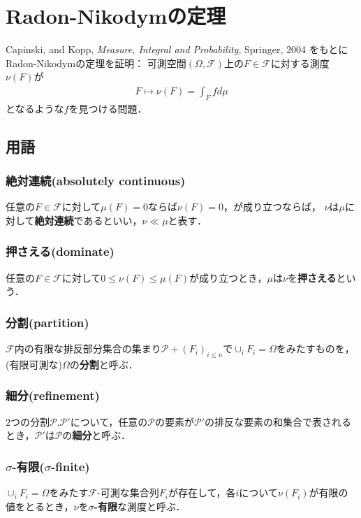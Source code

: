 \documentclass[a4paper,10pt]{jsarticle}
\theoremstyle{definition}
\newcommand{\eq}[1]{\begin{align}#1\end{align}}
\begin{document}
\section{Radon-Nikodymの定理}
Capinski, and Kopp, \textit{Measure, Integral and Probability}, Springer, 2004 をもとにRadon-Nikodymの定理を証明：
可測空間$(\Omega,\mathcal{F})$上の$F\in\mathcal{F}$に対する測度$\nu(F)$が
\eq{F\mapsto\nu(F)=\int_Ffd\mu}
となるような$f$を見つける問題．
\subsection*{用語}
\subsubsection*{絶対連続(absolutely continuous)}
任意の$F\in\mathcal{F}$に対して$\mu(F)=0$ならば$\nu(F)=0$，が成り立つならば，
$\nu$は$\mu$に対して\textbf{絶対連続}であるといい，$\nu\ll\mu$と表す．
\subsubsection*{押さえる(dominate)}
任意の$F\in\mathcal{F}$に対して$0\le\nu(F)\le\mu(F)$が成り立つとき，$\mu$は$\nu$を\textbf{押さえる}という．
\subsubsection*{分割(partition)}
$\mathcal{F}$内の有限な排反部分集合の集まり$\mathcal{P}+\left(F_i\right)_{i\le n}$で$\cup_iF_i=\Omega$をみたすものを，(有限可測な)$\Omega$の\textbf{分割}と呼ぶ．
\subsubsection*{細分(refinement)}
$2$つの分割$\mathcal{P}$,$\mathcal{P}'$について，任意の$\mathcal{P}$の要素が$\mathcal{P}'$の排反な要素の和集合で表されるとき，$\mathcal{P}'$は$\mathcal{P}$の\textbf{細分}と呼ぶ．
\subsubsection*{$\sigma$-有限($\sigma$-finite)}
$\cup_iF_i=\Omega$をみたす$\mathcal{F}$-可測な集合列$F_i$が存在して，各$i$について$\nu(F_i)$が有限の値をとるとき，$\nu$を$\sigma$\textbf{-有限}な測度と呼ぶ．
\end{document}
